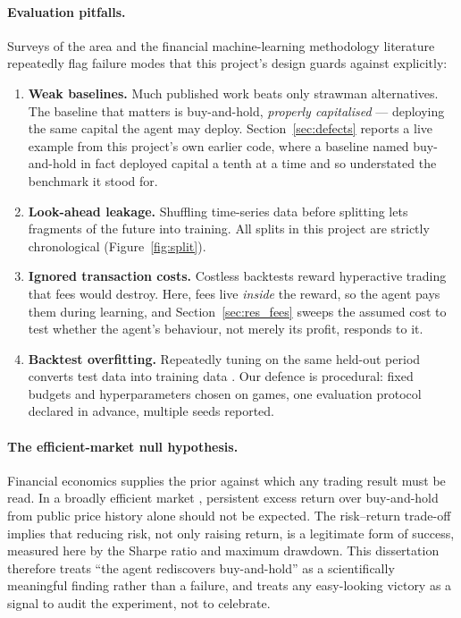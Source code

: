 \paragraph{Evaluation pitfalls.} Surveys of the area \cite{fischer2018}
and the financial machine-learning methodology literature
\cite{bailey2014, lopezdeprado2018} repeatedly flag failure modes that
this project's design guards against explicitly:

\begin{enumerate}
  \item \textbf{Weak baselines.} Much published work beats only strawman
        alternatives. The baseline that matters is buy-and-hold,
        \emph{properly capitalised} --- deploying the same capital the
        agent may deploy. Section~\ref{sec:defects} reports a live example
        from this project's own earlier code, where a baseline named
        buy-and-hold in fact deployed capital a tenth at a time and so
        understated the benchmark it stood for.
  \item \textbf{Look-ahead leakage.} Shuffling time-series data before
        splitting lets fragments of the future into training. All splits
        in this project are strictly chronological
        (Figure~\ref{fig:split}).
  \item \textbf{Ignored transaction costs.} Costless backtests reward
        hyperactive trading that fees would destroy. Here, fees live
        \emph{inside} the reward, so the agent pays them during learning,
        and Section~\ref{sec:res_fees} sweeps the assumed cost to test
        whether the agent's behaviour, not merely its profit, responds to
        it.
  \item \textbf{Backtest overfitting.} Repeatedly tuning on the same
        held-out period converts test data into training data
        \cite{bailey2014}. Our defence is procedural: fixed budgets and
        hyperparameters chosen on games, one evaluation protocol declared
        in advance, multiple seeds reported.
\end{enumerate}

\paragraph{The efficient-market null hypothesis.} Financial economics
supplies the prior against which any trading result must be read. In a
broadly efficient market \cite{fama1970}, persistent excess return over
buy-and-hold from public price history alone should not be expected. The
risk--return trade-off \cite{markowitz1952} implies that reducing risk,
not only raising return, is a legitimate form of success, measured here
by the Sharpe ratio \cite{sharpe1994} and maximum drawdown. This
dissertation therefore treats ``the agent rediscovers buy-and-hold'' as a
scientifically meaningful finding rather than a failure, and treats any
easy-looking victory as a signal to audit the experiment, not to
celebrate.

